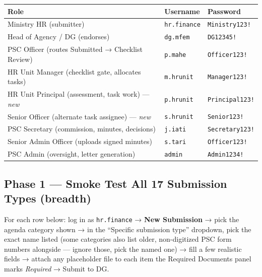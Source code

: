 \documentclass[
  11pt,
  letterpaper,
  DIV=11,
  numbers=noendperiod]{scrartcl}
\newcounter{none} %
\begin{document}
{\def\LTcaptype{none} %
\begin{longtable}[]{@{}
  >{\raggedright\arraybackslash}p{}
  >{\raggedright\arraybackslash}p{}
  >{\raggedright\arraybackslash}p{}@{}}
\toprule\noalign{}
\begin{minipage}[b]{\linewidth}\raggedright
Role
\end{minipage} & \begin{minipage}[b]{\linewidth}\raggedright
Username
\end{minipage} & \begin{minipage}[b]{\linewidth}\raggedright
Password
\end{minipage} \\
\midrule\noalign{}
\endhead
\bottomrule\noalign{}
\endlastfoot
Ministry HR (submitter) & \texttt{hr.finance} & \texttt{Ministry123!} \\
Head of Agency / DG (endorses) & \texttt{dg.mfem} & \texttt{DG12345!} \\
PSC Officer (routes Submitted → Checklist Review) & \texttt{p.mahe} &
\texttt{Officer123!} \\
HR Unit Manager (checklist gate, allocates tasks) & \texttt{m.hrunit} &
\texttt{Manager123!} \\
HR Unit Principal (assessment, task work) --- \emph{new} &
\texttt{p.hrunit} & \texttt{Principal123!} \\
Senior Officer (alternate task assignee) --- \emph{new} &
\texttt{s.hrunit} & \texttt{Senior123!} \\
PSC Secretary (commission, minutes, decisions) & \texttt{j.iati} &
\texttt{Secretary123!} \\
Senior Admin Officer (uploads signed minutes) & \texttt{s.tari} &
\texttt{Officer123!} \\
PSC Admin (oversight, letter generation) & \texttt{admin} &
\texttt{Admin1234!} \\
\end{longtable}
}

\subsection{Phase 1 --- Smoke Test All 17 Submission Types
(breadth)}\label{phase-1-smoke-test-all-17-submission-types-breadth}

For each row below: log in as \texttt{hr.finance} → \textbf{New
Submission} → pick the agenda category shown → in the ``Specific
submission type'' dropdown, pick the exact name listed (some categories
also list older, non-digitized PSC form numbers alongside --- ignore
those, pick the named one) → fill a few realistic fields → attach any
placeholder file to each item the Required Documents panel marks
\emph{Required} → Submit to DG.
\end{document}
